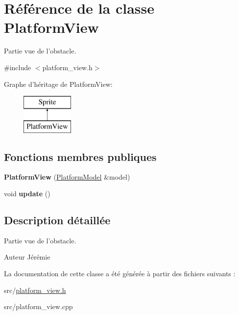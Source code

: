 \hypertarget{class_platform_view}{\section{Référence de la classe Platform\+View}
\label{class_platform_view}
}


Partie vue de l'obstacle.  




{\ttfamily \#include $<$platform\+\_\+view.\+h$>$}

Graphe d'héritage de Platform\+View\+:\begin{figure}[H]
\begin{center}
\leavevmode
\includegraphics[height=2.000000cm]{class_platform_view}
\end{center}
\end{figure}
\subsection*{Fonctions membres publiques}
\begin{DoxyCompactItemize}
\item 
\hypertarget{class_platform_view_a9581615b0d63f2b908492a8b83340f5c}{{\bfseries Platform\+View} (\hyperlink{class_platform_model}{Platform\+Model} \&model)}\label{class_platform_view_a9581615b0d63f2b908492a8b83340f5c}

\item 
\hypertarget{class_platform_view_a0685923b10eb4ea3dacfd1dd0c4022bb}{void {\bfseries update} ()}\label{class_platform_view_a0685923b10eb4ea3dacfd1dd0c4022bb}

\end{DoxyCompactItemize}


\subsection{Description détaillée}
Partie vue de l'obstacle. 

\begin{DoxyAuthor}{Auteur}
Jérémie 
\end{DoxyAuthor}


La documentation de cette classe a été générée à partir des fichiers suivants \+:\begin{DoxyCompactItemize}
\item 
src/\hyperlink{platform__view_8h}{platform\+\_\+view.\+h}\item 
src/platform\+\_\+view.\+cpp\end{DoxyCompactItemize}
